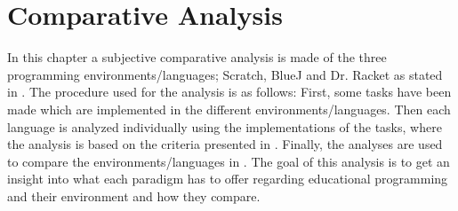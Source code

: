 \chapter{Comparative Analysis}
\label{chap:comparative_analysis}
In this chapter a subjective comparative analysis is made of the three programming environments/languages; Scratch, BlueJ and Dr. Racket as stated in . The procedure used for the analysis is as follows: First, some tasks have been made which are implemented in the different environments/languages. Then each language is analyzed individually using the implementations of the tasks, where the analysis is based on the criteria presented in . Finally, the analyses are used to compare the environments/languages in .  The goal of this analysis is to get an insight into what each paradigm has to offer regarding educational programming and their environment and how they compare. 

